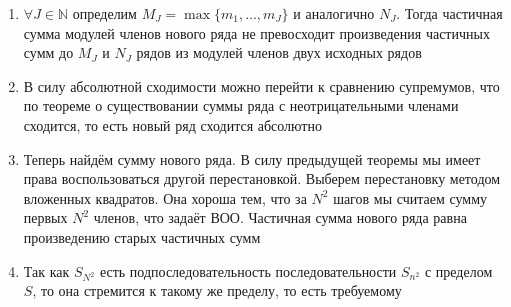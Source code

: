 \begin{enumerate}
    \item $\forall J \in \mathbb{N}$ определим $M_J = \max \{m_1, \dots, m_J\}$ и аналогично $N_J$.
    Тогда частичная сумма модулей членов нового ряда не превосходит произведения частичных сумм до $M_J$ и $N_J$
    рядов из модулей членов двух исходных рядов
    \item В силу абсолютной сходимости можно перейти к сравнению супремумов, что по теореме о существовании суммы
    ряда с неотрицательными членами сходится, то есть новый ряд сходится абсолютно
    \item Теперь найдём сумму нового ряда.
    В силу предыдущей теоремы мы имеет права воспользоваться другой перестановкой.
    Выберем перестановку методом вложенных квадратов.
    Она хороша тем, что за $N^2$ шагов мы считаем сумму первых $N^2$ членов, что задаёт ВОО.
    Частичная сумма нового ряда равна произведению старых частичных сумм
    \item Так как $S_{N^2}$ есть подпоследовательность последовательности $S_{n^2}$ с пределом $S$, то она
    стремится к такому же пределу, то есть требуемому
\end{enumerate}